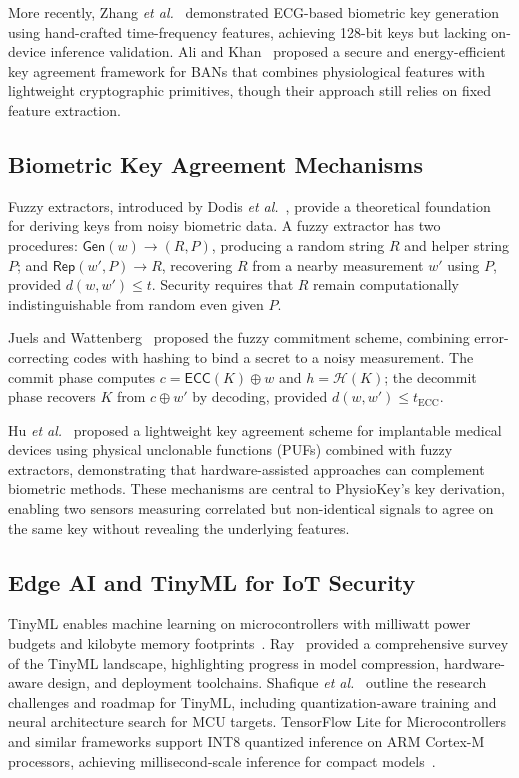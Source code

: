 \documentclass[sensors,article,submit,pdftex,moreauthors]{Definitions/mdpi}
\newcommand{\etal}{\textit{et al.}}
\begin{document}
More recently, Zhang \etal~\cite{zhang2022ecg} demonstrated ECG-based biometric key generation using hand-crafted time-frequency features, achieving 128-bit keys but lacking on-device inference validation. Ali and Khan~\cite{ali2020secure} proposed a secure and energy-efficient key agreement framework for BANs that combines physiological features with lightweight cryptographic primitives, though their approach still relies on fixed feature extraction.

\subsection{Biometric Key Agreement Mechanisms}
\label{subsec:biometric}

Fuzzy extractors, introduced by Dodis \etal~\cite{dodis2008fuzzy}, provide a theoretical foundation for deriving keys from noisy biometric data. A fuzzy extractor has two procedures: $\mathsf{Gen}(w) \rightarrow (R, P)$, producing a random string $R$ and helper string $P$; and $\mathsf{Rep}(w', P) \rightarrow R$, recovering $R$ from a nearby measurement $w'$ using $P$, provided $d(w, w') \leq t$. Security requires that $R$ remain computationally indistinguishable from random even given $P$.

Juels and Wattenberg~\cite{juels1999fuzzy} proposed the fuzzy commitment scheme, combining error-correcting codes with hashing to bind a secret to a noisy measurement. The commit phase computes $c = \mathsf{ECC}(K) \oplus w$ and $h = \mathcal{H}(K)$; the decommit phase recovers $K$ from $c \oplus w'$ by decoding, provided $d(w, w') \leq t_{\text{ECC}}$.

Hu \etal~\cite{hu2021lightweight} proposed a lightweight key agreement scheme for implantable medical devices using physical unclonable functions (PUFs) combined with fuzzy extractors, demonstrating that hardware-assisted approaches can complement biometric methods. These mechanisms are central to PhysioKey's key derivation, enabling two sensors measuring correlated but non-identical signals to agree on the same key without revealing the underlying features.

\subsection{Edge AI and TinyML for IoT Security}
\label{subsec:tinyml}

TinyML enables machine learning on microcontrollers with milliwatt power budgets and kilobyte memory footprints~\cite{warden2019tinyml, banbury2021mlperf}. Ray~\cite{ray2022review} provided a comprehensive survey of the TinyML landscape, highlighting progress in model compression, hardware-aware design, and deployment toolchains. Shafique \etal~\cite{shafique2023tinyml} outline the research challenges and roadmap for TinyML, including quantization-aware training and neural architecture search for MCU targets. TensorFlow Lite for Microcontrollers and similar frameworks support INT8 quantized inference on ARM Cortex-M processors, achieving millisecond-scale inference for compact models~\cite{david2021tensorflow}.
\end{document}
